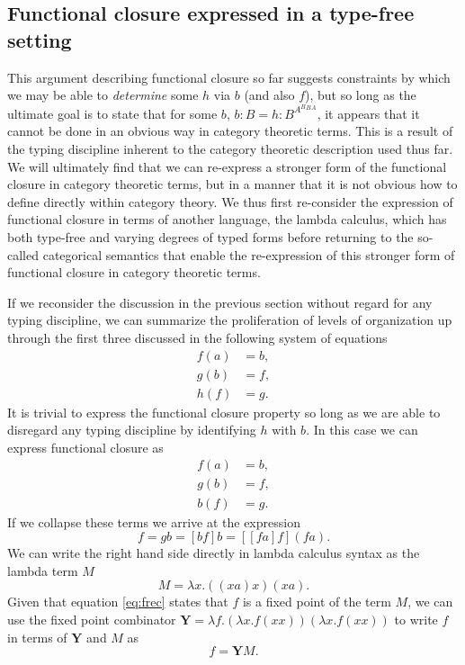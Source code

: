 \subsection*{Functional closure expressed in a type-free setting}
This argument describing functional closure so far suggests constraints by which we may be able to \emph{determine} some $h$ via $b$ (and also $f$), but so long as the ultimate goal is to state that for some $b$, $b:B = h:B^{A^B{^B{^A}}}$, it appears that it cannot be done in an obvious way in category theoretic terms. This is a result of the typing discipline inherent to the category theoretic description used thus far. We will ultimately find that we can re-express a stronger form of the functional closure in category theoretic terms, but in a manner that it is not obvious how to define directly within category theory. We thus first re-consider the expression of functional closure in terms of another language, the lambda calculus, which has both type-free and varying degrees of typed forms \cite{Barendregt1985} before returning to the so-called categorical semantics that enable the re-expression of this stronger form of functional closure in category theoretic terms.

If we reconsider the discussion in the previous section without regard for any typing discipline, we can summarize the proliferation of levels of organization up through the first three discussed in the following system of equations
\begin{align*}
f(a)&=b,\\
g(b)&=f,\\
h(f)&=g.
\end{align*}
It is trivial to express the functional closure property so long as we are able to disregard any typing discipline by identifying $h$ with $b$. In this case we can express functional closure as
\begin{align*}
f(a)&=b,\\
g(b)&=f,\\
b(f)&=g.
\end{align*}
If we collapse these terms we arrive at the expression
\begin{equation}\label{eq:frec}
f = gb = [bf]b = [[fa]f](fa).
\end{equation}
We can write the right hand side directly in lambda calculus syntax as the lambda term $M$
$$
M = \lambda x.((xa)x)(xa).
$$
Given that equation \ref{eq:frec} states that $f$ is a fixed point of the term $M$, we can use the fixed point combinator $\mathbf{Y} = \lambda f.(\lambda x. f (x x))(\lambda x. f (x x))$ to write $f$ in terms of $\mathbf{Y}$ and $M$ as
$$
f = \mathbf{Y}M.
$$

